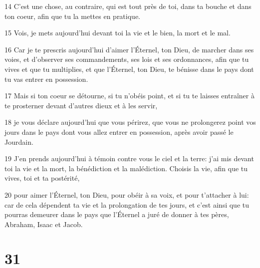 \par 14 C'est une chose, au contraire, qui est tout près de toi, dans ta bouche et dans ton coeur, afin que tu la mettes en pratique.
\par 15 Vois, je mets aujourd'hui devant toi la vie et le bien, la mort et le mal.
\par 16 Car je te prescris aujourd'hui d'aimer l'Éternel, ton Dieu, de marcher dans ses voies, et d'observer ses commandements, ses lois et ses ordonnances, afin que tu vives et que tu multiplies, et que l'Éternel, ton Dieu, te bénisse dans le pays dont tu vas entrer en possession.
\par 17 Mais si ton coeur se détourne, si tu n'obéis point, et si tu te laisses entraîner à te prosterner devant d'autres dieux et à les servir,
\par 18 je vous déclare aujourd'hui que vous périrez, que vous ne prolongerez point vos jours dans le pays dont vous allez entrer en possession, après avoir passé le Jourdain.
\par 19 J'en prends aujourd'hui à témoin contre vous le ciel et la terre: j'ai mis devant toi la vie et la mort, la bénédiction et la malédiction. Choisis la vie, afin que tu vives, toi et ta postérité,
\par 20 pour aimer l'Éternel, ton Dieu, pour obéir à sa voix, et pour t'attacher à lui: car de cela dépendent ta vie et la prolongation de tes jours, et c'est ainsi que tu pourras demeurer dans le pays que l'Éternel a juré de donner à tes pères, Abraham, Isaac et Jacob.

\chapter{31}

